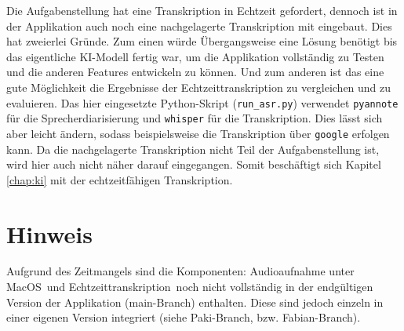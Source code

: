 Die Aufgabenstellung hat eine Transkription in Echtzeit gefordert, dennoch ist in der Applikation auch noch eine nachgelagerte Transkription mit eingebaut. Dies hat zweierlei Gründe. Zum einen würde Übergangsweise eine Lösung benötigt bis das eigentliche KI-Modell fertig war, um die Applikation vollständig zu Testen und die anderen Features entwickeln zu können. Und zum anderen ist das eine gute Möglichkeit die Ergebnisse der Echtzeittranskription zu vergleichen und zu evaluieren. Das hier eingesetzte Python-Skript (\texttt{run\_asr.py}) verwendet \texttt{pyannote} für die Sprecherdiarisierung und \texttt{whisper} für die Transkription. Dies lässt sich aber leicht ändern, sodass beispielsweise die Transkription über \texttt{google} erfolgen kann. Da die nachgelagerte Transkription nicht Teil der Aufgabenstellung ist, wird hier auch nicht näher darauf eingegangen. Somit beschäftigt sich Kapitel \ref{chap:ki} mit der echtzeitfähigen Transkription.

\section*{Hinweis}
Aufgrund des Zeitmangels sind die Komponenten: \glqq Audioaufnahme unter MacOS\grqq\ und \glqq Echtzeittranskription\grqq\ noch nicht vollständig in der endgültigen Version der Applikation (main-Branch) enthalten. Diese sind jedoch einzeln in einer eigenen Version integriert (siehe Paki-Branch, bzw. Fabian-Branch).
